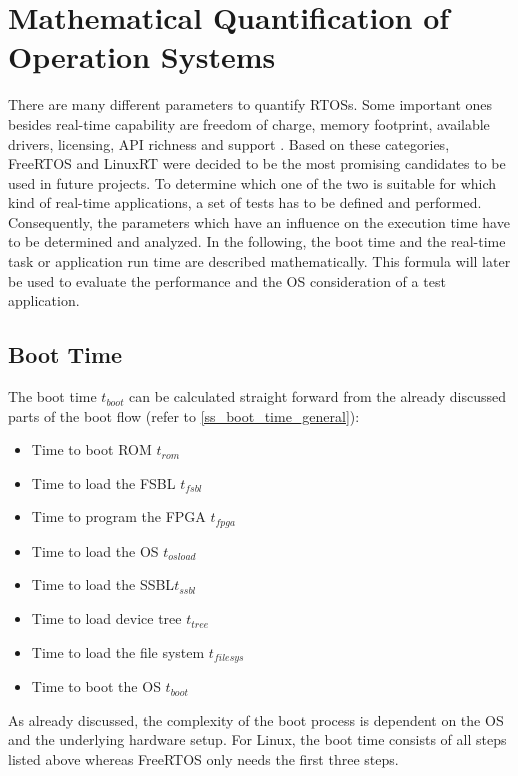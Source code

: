 \section{Mathematical Quantification of Operation Systems}
There are many different parameters to quantify \acp{RTOS}.
Some important ones besides real-time capability are freedom of charge, memory footprint, available drivers, licensing, \ac{API} richness and support \cite{Anh:sapeortosfsm}.   
Based on these categories, FreeRTOS and LinuxRT were decided to be the most promising candidates to be used in future projects.
To determine which one of the two is suitable for which kind of real-time applications, a set of tests has to be defined and performed.
Consequently, the parameters which have an influence on the execution time have to be determined and analyzed.
In the following, the boot time and the real-time task or application run time are described mathematically.
This formula will later be used to evaluate the performance and the \ac{OS} consideration of a test application.

\subsection{Boot Time}\label{ss_boot_time_math}
The boot time $ t_{boot} $ can be calculated straight forward from the already discussed parts of the boot flow (refer to \ref{ss_boot_time_general}):
\begin{itemize}
	\item Time to boot \ac{ROM} $ t_{rom} $
	\item Time to load the \ac{FSBL} $ t_{fsbl} $
	\item Time to program the \ac{FPGA} $ t_{fpga} $
	\item Time to load the \ac{OS} $ t_{osload} $
	\item Time to load the \ac{SSBL}$ t_{ssbl} $ 
	\item Time to load device tree $t_{tree} $
	\item Time to load the file system $ t_{filesys}$
	\item Time to boot the \ac{OS} $ t_{boot} $
\end{itemize} 
As already discussed, the complexity of the boot process is dependent on the \ac{OS} and the underlying hardware setup.
For Linux, the boot time consists of all steps listed above whereas FreeRTOS only needs the first three steps. 
  
